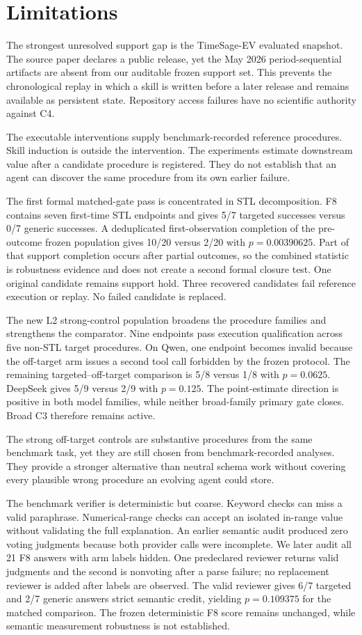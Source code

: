\section{Limitations}
The strongest unresolved support gap is the TimeSage-EV evaluated snapshot. The source paper declares a public release, yet the May 2026 period-sequential artifacts are absent from our auditable frozen support set. This prevents the chronological replay in which a skill is written before a later release and remains available as persistent state. Repository access failures have no scientific authority against C4.

The executable interventions supply benchmark-recorded reference procedures. Skill induction is outside the intervention. The experiments estimate downstream value after a candidate procedure is registered. They do not establish that an agent can discover the same procedure from its own earlier failure.

The first formal matched-gate pass is concentrated in STL decomposition. F8 contains seven first-time STL endpoints and gives 5/7 targeted successes versus 0/7 generic successes. A deduplicated first-observation completion of the pre-outcome frozen population gives 10/20 versus 2/20 with $p=0.00390625$. Part of that support completion occurs after partial outcomes, so the combined statistic is robustness evidence and does not create a second formal closure test. One original candidate remains support hold. Three recovered candidates fail reference execution or replay. No failed candidate is replaced.

The new L2 strong-control population broadens the procedure families and strengthens the comparator. Nine endpoints pass execution qualification across five non-STL target procedures. On Qwen, one endpoint becomes invalid because the off-target arm issues a second tool call forbidden by the frozen protocol. The remaining targeted--off-target comparison is 5/8 versus 1/8 with $p=0.0625$. DeepSeek gives 5/9 versus 2/9 with $p=0.125$. The point-estimate direction is positive in both model families, while neither broad-family primary gate closes. Broad C3 therefore remains active.

The strong off-target controls are substantive procedures from the same benchmark task, yet they are still chosen from benchmark-recorded analyses. They provide a stronger alternative than neutral schema work without covering every plausible wrong procedure an evolving agent could store.

The benchmark verifier is deterministic but coarse. Keyword checks can miss a valid paraphrase. Numerical-range checks can accept an isolated in-range value without validating the full explanation. An earlier semantic audit produced zero voting judgments because both provider calls were incomplete. We later audit all 21 F8 answers with arm labels hidden. One predeclared reviewer returns valid judgments and the second is nonvoting after a parse failure; no replacement reviewer is added after labels are observed. The valid reviewer gives 6/7 targeted and 2/7 generic answers strict semantic credit, yielding $p=0.109375$ for the matched comparison. The frozen deterministic F8 score remains unchanged, while semantic measurement robustness is not established.

